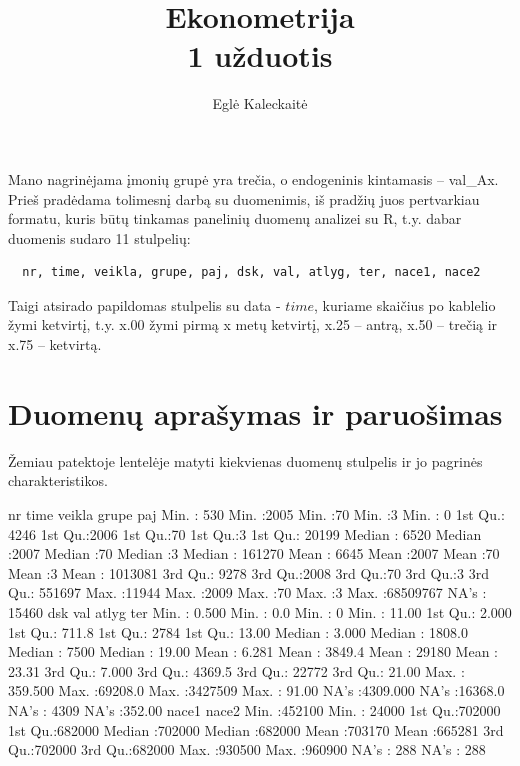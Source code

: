 \documentclass[a4paper]{article}
\title{Ekonometrija \\1 užduotis}
\author{Eglė Kaleckaitė}
\newcommand{\R}{R}
\begin{document}
\maketitle

Mano nagrinėjama įmonių grupė yra trečia, o endogeninis kintamasis --
val\_Ax. Prieš pradėdama tolimesnį darbą su duomenimis, iš pradžių
juos pertvarkiau formatu, kuris būtų tinkamas panelinių duomenų
analizei su \R{}, t.y. dabar duomenis sudaro 11 stulpelių:
\begin{verbatim}
  nr, time, veikla, grupe, paj, dsk, val, atlyg, ter, nace1, nace2
\end{verbatim}  
Taigi atsirado papildomas stulpelis su data - $time$, kuriame skaičius
po kablelio žymi ketvirtį, t.y. x.00 žymi pirmą x metų ketvirtį, x.25
-- antrą, x.50 -- trečią ir x.75 -- ketvirtą.
\section{Duomenų aprašymas ir paruošimas}
Žemiau patektoje lentelėje matyti kiekvienas duomenų stulpelis ir jo
pagrinės charakteristikos.
\begin{Schunk}
\begin{Soutput}
       nr             time          veikla       grupe        paj          
 Min.   :  530   Min.   :2005   Min.   :70   Min.   :3   Min.   :       0  
 1st Qu.: 4246   1st Qu.:2006   1st Qu.:70   1st Qu.:3   1st Qu.:   20199  
 Median : 6520   Median :2007   Median :70   Median :3   Median :  161270  
 Mean   : 6645   Mean   :2007   Mean   :70   Mean   :3   Mean   : 1013081  
 3rd Qu.: 9278   3rd Qu.:2008   3rd Qu.:70   3rd Qu.:3   3rd Qu.:  551697  
 Max.   :11944   Max.   :2009   Max.   :70   Max.   :3   Max.   :68509767  
                                                         NA's   :   15460  
      dsk                val              atlyg              ter        
 Min.   :   0.500   Min.   :    0.0   Min.   :      0   Min.   : 11.00  
 1st Qu.:   2.000   1st Qu.:  711.8   1st Qu.:   2784   1st Qu.: 13.00  
 Median :   3.000   Median : 1808.0   Median :   7500   Median : 19.00  
 Mean   :   6.281   Mean   : 3849.4   Mean   :  29180   Mean   : 23.31  
 3rd Qu.:   7.000   3rd Qu.: 4369.5   3rd Qu.:  22772   3rd Qu.: 21.00  
 Max.   : 359.500   Max.   :69208.0   Max.   :3427509   Max.   : 91.00  
 NA's   :4309.000   NA's   :16368.0   NA's   :   4309   NA's   :352.00  
     nace1            nace2       
 Min.   :452100   Min.   : 24000  
 1st Qu.:702000   1st Qu.:682000  
 Median :702000   Median :682000  
 Mean   :703170   Mean   :665281  
 3rd Qu.:702000   3rd Qu.:682000  
 Max.   :930500   Max.   :960900  
 NA's   :   288   NA's   :   288  
\end{Soutput}
\end{Schunk}
\end{document}
